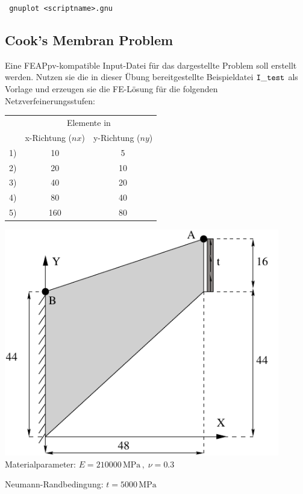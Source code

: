 \ebn
\verb| gnuplot <scriptname>.gnu |
\een





\subsection{Cook's Membran Problem}


\begin{minipage}{0.4\textwidth}
Eine FEAPpv-kompatible Input-Datei für das dargestellte Problem soll erstellt werden.
Nutzen sie die in dieser Übung bereitgestellte Beispieldatei $\tt I\_test$ als Vorlage und erzeugen sie die FE-Lösung für die folgenden Netzverfeinerungsstufen:

\begin{center}
\begin{tabular}{rc|c}
 & \multicolumn{2}{c}{Elemente in}\\
 & x-Richtung ($nx$) & y-Richtung ($ny$) \\\cline{2-3}
1) & 10 & 5\\
2) & 20 & 10\\
3) & 40 & 20\\
4) & 80 & 40\\
5) & 160 & 80\\
\end{tabular}
\end{center}
\end{minipage}
%
\hfill
%
\begin{minipage}{0.54\textwidth}
 \includegraphics[width=0.9\textwidth]{fig/ue6_cm_problem_description.pdf}
 \smallskip
Materialparameter:
$E = 210000\,\mbox{MPa} \,,\; \nu = 0.3$

Neumann-Randbedingung:
$t = 5000\,\mbox{MPa}$
\end{minipage}

